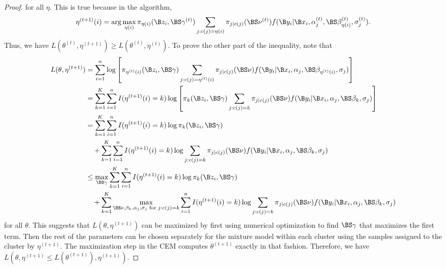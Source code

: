 \begin{proof}
for all $\eta$. This is true because in the algorithm, $$\eta^{(t+1)}(i) = \arg \max_{\eta(i)} \pi_{\eta(i)}(\B z_{i},\BS \gamma^{(t)})\sum_{j:c(j)=\eta(i)}\pi_{j|c(j)}(\BS\nu^{(t)})f(\B y_{i}|\B x_{i},\alpha_{j}^{(t)},\BS\beta^{(t)}_{\eta(i)},\sigma^{(t)}_{j}).$$
   Thus, we have $    L(\theta^{(t)},\eta^{(t+1)})\geq L(\theta^{(t)},\eta^{(t)})$. To prove the other part of the inequality, note that
       \begin{align*}
 L(\theta,\eta^{(t+1)})  &= \sum^{n}_{i=1}\log\left[\pi_{\eta^{(t)}(i)}(\B z_{i},\BS \gamma)\sum_{j:c(j)=\eta^{(t)}(i)}\pi_{j|c(j)}(\BS\nu)f(\B y_{i}|\B x_{i},\alpha_{j},\BS\beta_{\eta^{(t)}(i)},\sigma_{j})\right]\\
 &= \sum^{K}_{k=1}\sum^{n}_{i=1}I(\eta^{(t+1)}(i) = k)\log\left[\pi_{k}(\B z_{i},\BS \gamma)\sum_{j:c(j)=k}\pi_{j|c(j)}(\BS\nu)f(\B y_{i}|\B x_{i},\alpha_{j},\BS\beta_{k},\sigma_{j})\right]\\
  &= \sum^{K}_{k=1}\sum^{n}_{i=1}I(\eta^{(t+1)}(i) = k)\log\pi_{k}(\B z_{i},\BS \gamma)\\
  &\quad+\sum^{K}_{k=1}\sum^{n}_{i=1}I(\eta^{(t+1)}(i) = k)\log \sum_{j:c(j)=k}\pi_{j|c(j)}(\BS\nu)f(\B y_{i}|\B x_{i},\alpha_{j},\BS\beta_{k},\sigma_{j})\\
    &\leq\max_{\BS\gamma} \sum^{K}_{k=1}\sum^{n}_{i=1}I(\eta^{(t+1)}(i) = k)\log\pi_{k}(\B z_{i},\BS \gamma)\\
  &\quad+\sum^{K}_{k=1}\max_{\BS \nu,\beta_{k},\alpha_{j},\sigma_{j}\text{ for }j:c(j)=k}\sum^{n}_{i=1}I(\eta^{(t+1)}(i) = k)\log \sum_{j:c(j)=k}\pi_{j|c(j)}(\BS\nu)f(\B y_{i}|\B x_{i},\alpha_{j},\BS\beta_{k},\sigma_{j})\\
    \end{align*}
    for all $\theta$. This suggests that $L(\theta,\eta^{(t+1)})$ can be maximized by first using numerical optimization to find $\BS\gamma$ that maximizes the first term. Then the rest of the parameters can be chosen separately for the mixture model within each cluster using the samples assigned to the cluster by $\eta^{(t+1)}$. The maximization step in the CEM computes $\theta^{(t+1)}$ exactly in that fashion. Therefore, we have $L(\theta,\eta^{(t+1)}\leq L(\theta^{(t+1)}),\eta^{(t+1)})$. 
    \end{proof}